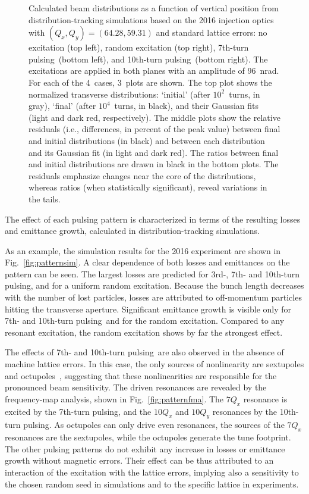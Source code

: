 \documentclass[
prstab
,reprint
,linenumbers
,longbibliography
,preprintnumbers
,showkeys
,amsfonts,amssymb,amsmath
,floatfix
]{revtex4-1}
\newcommand{\seventhtp}{7th-turn pulsing}
\newcommand{\tenthtp}{10th-turn pulsing}
\begin{document}
\begin{figure}
\begin{tabular}{cc}
  \end{tabular}
  \caption{Calculated beam distributions as a function of vertical
    position from distribution-tracking simulations based on the 2016
    injection optics with $(Q_x, Q_y) = (64.28, 59.31)$ and standard
    lattice errors: no excitation (top left), random excitation (top
    right), \seventhtp\ (bottom left), and
    \tenthtp\ (bottom right). The excitations
    are applied in both planes with an amplitude of 96~nrad. For each
    of the 4~cases, 3~plots are shown. The top plot shows the
    normalized transverse distributions: `initial' (after
    $10^2$~turns, in gray), `final' (after $10^4$~turns, in black),
    and their Gaussian fits (light and dark red, respectively). The
    middle plots show the relative residuals (i.e., differences, in
    percent of the peak value) between final and initial distributions
    (in black) and between each distribution and its Gaussian fit (in
    light and dark red). The ratios between final and initial
    distributions are drawn in black in the bottom plots. The
    residuals emphasize changes near the core of the distributions,
    whereas ratios (when statistically significant), reveal variations
    in the tails.}
  \label{fig:patternhist}
\end{figure}


The effect of each pulsing pattern is characterized in terms of the
resulting losses and emittance growth, calculated in
distribution-tracking simulations.

As an example, the simulation results for the 2016 experiment are
shown in Fig.~\ref{fig:patternsim}.  A clear dependence of both losses
and emittances on the pattern can be seen.  The largest losses are
predicted for 3rd-, 7th- and \tenthtp, and for a uniform random
excitation. Because the bunch length decreases with the number of lost
particles, losses are attributed to off-momentum particles hitting the
transverse aperture. Significant emittance growth is visible only for
7th- and \tenthtp\ and for the random excitation. Compared to any
resonant excitation, the random excitation shows by far the strongest
effect.

The effects of 7th- and \tenthtp\ are also observed in the absence of
machine lattice errors. In this case, the only sources of nonlinearity
are sextupoles and octupoles~\cite{md_sim_hel_res_ex_fitterer},
suggesting that these nonlinearities are responsible for the
pronounced beam sensitivity. The driven resonances are revealed by the
frequency-map analysis, shown in Fig.~\ref{fig:patternfma}. The
$7 Q_x$ resonance is excited by the \seventhtp, and the $10 Q_x$ and
$10 Q_y$ resonances by the \tenthtp. As octupoles can only drive even
resonances, the sources of the $7 Q_x$ resonances are the sextupoles,
while the octupoles generate the tune footprint. The other pulsing
patterns do not exhibit any increase in losses or emittance growth
without magnetic errors. Their effect can be thus attributed to an
interaction of the excitation with the lattice errors, implying also a
sensitivity to the chosen random seed in simulations and to the
specific lattice in experiments.
\end{document}

